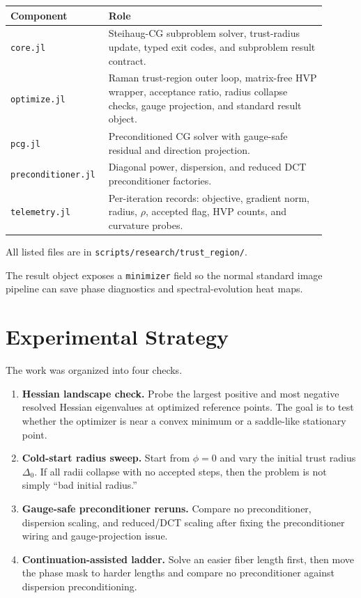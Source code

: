 \documentclass[11pt]{article}
\begin{document}
\begin{center}
\small
\begin{tabular}{p{0.24\linewidth}p{0.66\linewidth}}
\toprule
\textbf{Component} & \textbf{Role} \\
\midrule
\texttt{core.jl}
& Steihaug-CG subproblem solver, trust-radius update, typed exit codes, and
subproblem result contract. \\
\texttt{optimize.jl}
& Raman trust-region outer loop, matrix-free HVP wrapper, acceptance ratio,
radius collapse checks, gauge projection, and standard result object. \\
\texttt{pcg.jl}
& Preconditioned CG solver with gauge-safe residual and direction projection. \\
\texttt{preconditioner.jl}
& Diagonal power, dispersion, and reduced DCT preconditioner factories. \\
\texttt{telemetry.jl}
& Per-iteration records: objective, gradient norm, radius, \(\rho\), accepted
flag, HVP counts, and curvature probes. \\
\bottomrule
\end{tabular}
\end{center}

All listed files are in \texttt{scripts/research/trust\_region/}.

The result object exposes a \texttt{minimizer} field so the normal standard
image pipeline can save phase diagnostics and spectral-evolution heat maps.

\section{Experimental Strategy}

The work was organized into four checks.

\begin{enumerate}
    \item \textbf{Hessian landscape check.} Probe the largest positive and
    most negative resolved Hessian eigenvalues at optimized reference points.
    The goal is to test whether the optimizer is near a convex minimum or a
    saddle-like stationary point.
    \item \textbf{Cold-start radius sweep.} Start from \(\phi=0\) and vary the
    initial trust radius \(\Delta_0\). If all radii collapse with no accepted
    steps, then the problem is not simply ``bad initial radius.''
    \item \textbf{Gauge-safe preconditioner reruns.} Compare no
    preconditioner, dispersion scaling, and reduced/DCT scaling after fixing
    the preconditioner wiring and gauge-projection issue.
    \item \textbf{Continuation-assisted ladder.} Solve an easier fiber length
    first, then move the phase mask to harder lengths and compare no
    preconditioner against dispersion preconditioning.
\end{enumerate}
\end{document}
